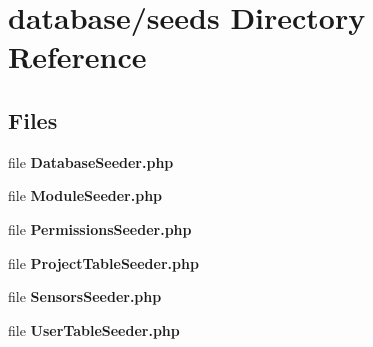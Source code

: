 \section{database/seeds Directory Reference}
\label{dir_b58b3b1c1a29b1b7275911c89cfc01c5}
\subsection*{Files}
\begin{DoxyCompactItemize}
\item 
file {\bf Database\+Seeder.\+php}
\item 
file {\bf Module\+Seeder.\+php}
\item 
file {\bf Permissions\+Seeder.\+php}
\item 
file {\bf Project\+Table\+Seeder.\+php}
\item 
file {\bf Sensors\+Seeder.\+php}
\item 
file {\bf User\+Table\+Seeder.\+php}
\end{DoxyCompactItemize}
